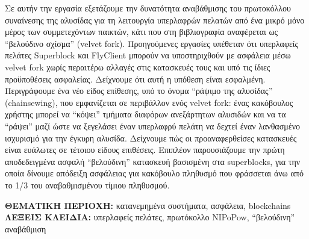 Σε αυτήν την εργασία εξετάζουμε την δυνατότητα αναβάθμισης του πρωτοκόλλου συναίνεσης της αλυσίδας για τη λειτουργία υπερλαφρών πελατών από ένα μικρό μόνο μέρος των συμμετεχόντων παικτών, κάτι που στη βιβλιογραφία αναφέρεται ως ``βελούδινο σχίσμα'' (velvet fork). Προηγούμενες εργασίες υπέθεταν ότι υπερλαφείς πελάτες Superblock και FlyClient μπορούν να υποστηριχθούν με ασφάλεια μέσω velvet fork χωρίς περαιτέρω αλλαγές στις κατασκευές τους και υπό τις ίδιες προϋποθέσεις ασφαλείας. Δείχνουμε ότι αυτή η υπόθεση είναι εσφαλμένη. Περιγράφουμε ένα νέο είδος επίθεσης, υπό το όνομα ``ράψιμο της αλυσίδας'' (chainsewing), που εμφανίζεται σε περιβάλλον ενός velvet fork: ένας κακόβουλος χρήστης μπορεί να ``κόψει'' τμήματα διαφόρων ανεξάρτητων αλυσιδών και να τα ``ράψει'' μαζί ώστε να ξεγελάσει έναν υπερλαφρύ πελάτη να δεχτεί έναν λανθασμένο ισχυρισμό για την έγκυρη αλυσίδα. Δείχνουμε πώς οι προαναφερθείσες κατασκευές είναι ευάλωτες σε τέτοιου είδους επιθέσεις. Επιπλέον παρουσιάζουμε την πρώτη αποδεδειγμένα ασφαλή ``βελούδινη'' κατασκευή βασισμένη στα superblocks, για την οποία δίνουμε απόδειξη ασφάλειας για κακόβουλο πληθυσμό που φράσσεται άνω από το 1/3 του αναβαθμισμένου τίμιου πληθυσμού.

\vspace{8cm}
\noindent
\textbf{ΘΕΜΑΤΙΚΗ ΠΕΡΙΟΧΗ:} κατανεμημένα συστήματα, ασφάλεια, blockchains\\
\textbf{ΛΕΞΕΙΣ ΚΛΕΙΔΙΑ:} υπερλαφείς πελάτες, πρωτόκολλο NIPoPow, ``βελούδινη'' αναβάθμιση



\newpage